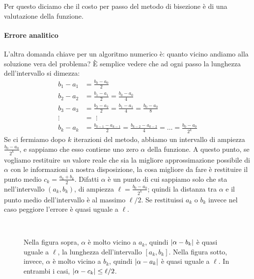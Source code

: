 \documentclass[a4paper]{report}
\DeclarePairedDelimiter{\abs}{\lvert}{\rvert}
\theoremstyle{definition}
\theoremstyle{remark}
\begin{document}
Per questo diciamo che il costo per passo del metodo di bisezione è di una valutazione della funzione.

\paragraph{Errore analitico}
L'altra domanda chiave per un algoritmo numerico è: quanto vicino andiamo alla soluzione vera del problema? È semplice vedere che ad ogni passo la lunghezza dell'intervallo si dimezza:
\begin{align*}
    b_1 - a_1 &= \frac{b_0-a_0}{2}\\
    b_2 - a_2 &= \frac{b_1-a_1}{2} = \frac{b_0-a_0}{4}\\
    b_3 - a_3 &= \frac{b_2-a_2}{2} = \frac{b_1-a_1}{4} = \frac{b_0-a_0}{8}\\
    \vdots \,\,&= \,\,\vdots\\
    b_{k} - a_{k} &= \frac{b_{k-1} - a_{k-1}}{2} = \frac{b_{k-2} - a_{k-2}}{4} = \dots = \frac{b_{0} - a_{0}}{2^k}
\end{align*}
Se ci fermiamo dopo $k$ iterazioni del metodo, abbiamo un intervallo di ampiezza $\frac{b_0-a_0}{2^{k}}$, e sappiamo che esso contiene uno zero $\alpha$ della funzione. A questo punto, se vogliamo restituire \emph{un} valore reale che sia la migliore approssimazione possibile di $\alpha$ con le informazioni a nostra disposizione, la cosa migliore da fare è restituire il punto medio $c_k = \frac{a_k + b_k}{2}$. Difatti $\alpha$ è un punto di cui sappiamo solo che sta nell'intervallo $(a_k,b_k)$, di ampiezza $\ell = \frac{b_0-a_0}{2^{k}}$; quindi la distanza tra $\alpha$ e il punto medio dell'intervallo è al massimo $\ell/2$. Se restituissi $a_k$ o $b_k$ invece nel caso peggiore l'errore è quasi uguale a $\ell$.
\begin{figure}[H]
\begin{center}
    \\
\end{center}
\caption{Nella figura sopra, $\alpha$ è molto vicino a $a_k$, quindi $\abs{\alpha - b_k}$ è quasi uguale a $\ell$, la lunghezza dell'intervallo $[a_k,b_k]$. Nella figura sotto, invece, $\alpha$ è molto vicino a $b_k$, quindi $\abs{\alpha - a_k}$ è quasi uguale a $\ell$. In entrambi i casi, $\abs{\alpha-c_k}\leq \ell/2$.}
\end{figure}
\end{document}
